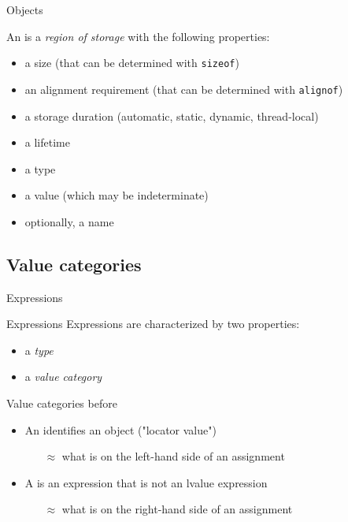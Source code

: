 \begin{frame}{Objects}{}
  \begin{definition}[Object]
    An  is a \emph{region of storage} with the following properties:
    \begin{itemize}
    \item
      a size (that can be determined with \lstinline!sizeof!)
    \item
      an alignment requirement (that can be determined with \lstinline!alignof!)
    \item
      a storage duration (automatic, static, dynamic, thread-local)
    \item
      a lifetime
    \item
      a type
    \item
      a value (which may be indeterminate)
    \item
      optionally, a name
    \end{itemize}
  \end{definition}
\end{frame}


\subsection{Value categories}

\begin{frame}{Expressions}{}
  \begin{block}{Expressions}
    Expressions are characterized by two properties:
    \begin{itemize}
    \item
      a \emph{type}
    \item
      a \emph{value category}
    \end{itemize}
  \end{block}

  \begin{block}{Value categories before }
    \begin{itemize}
    \item
      An  identifies an object ("locator value")
      \begin{itemize}
      \item[$\approx$]
        what is on the left-hand side  of an assignment
      \end{itemize}
    \item
      A  is an expression that is not an lvalue expression
      \begin{itemize}
      \item[$\approx$]
        what is on the right-hand side of an assignment
      \end{itemize}
    \end{itemize}
  \end{block}
\end{frame}

